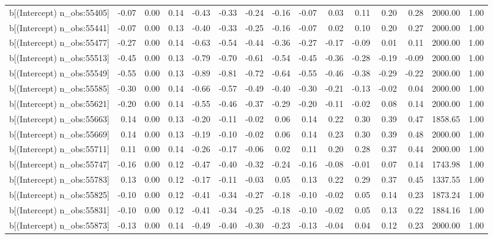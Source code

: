 \begin{table}[ht]
\begin{tabular}{rrrrrrrrrrrrrrr}
  b[(Intercept) n\_obs:55405] & -0.07 & 0.00 & 0.14 & -0.43 & -0.33 & -0.24 & -0.16 & -0.07 & 0.03 & 0.11 & 0.20 & 0.28 & 2000.00 & 1.00 \\ 
  b[(Intercept) n\_obs:55441] & -0.07 & 0.00 & 0.13 & -0.40 & -0.33 & -0.25 & -0.16 & -0.07 & 0.02 & 0.10 & 0.20 & 0.27 & 2000.00 & 1.00 \\ 
  b[(Intercept) n\_obs:55477] & -0.27 & 0.00 & 0.14 & -0.63 & -0.54 & -0.44 & -0.36 & -0.27 & -0.17 & -0.09 & 0.01 & 0.11 & 2000.00 & 1.00 \\ 
  b[(Intercept) n\_obs:55513] & -0.45 & 0.00 & 0.13 & -0.79 & -0.70 & -0.61 & -0.54 & -0.45 & -0.36 & -0.28 & -0.19 & -0.09 & 2000.00 & 1.00 \\ 
  b[(Intercept) n\_obs:55549] & -0.55 & 0.00 & 0.13 & -0.89 & -0.81 & -0.72 & -0.64 & -0.55 & -0.46 & -0.38 & -0.29 & -0.22 & 2000.00 & 1.00 \\ 
  b[(Intercept) n\_obs:55585] & -0.30 & 0.00 & 0.14 & -0.66 & -0.57 & -0.49 & -0.40 & -0.30 & -0.21 & -0.13 & -0.02 & 0.04 & 2000.00 & 1.00 \\ 
  b[(Intercept) n\_obs:55621] & -0.20 & 0.00 & 0.14 & -0.55 & -0.46 & -0.37 & -0.29 & -0.20 & -0.11 & -0.02 & 0.08 & 0.14 & 2000.00 & 1.00 \\ 
  b[(Intercept) n\_obs:55663] & 0.14 & 0.00 & 0.13 & -0.20 & -0.11 & -0.02 & 0.06 & 0.14 & 0.22 & 0.30 & 0.39 & 0.47 & 1858.65 & 1.00 \\ 
  b[(Intercept) n\_obs:55669] & 0.14 & 0.00 & 0.13 & -0.19 & -0.10 & -0.02 & 0.06 & 0.14 & 0.23 & 0.30 & 0.39 & 0.48 & 2000.00 & 1.00 \\ 
  b[(Intercept) n\_obs:55711] & 0.11 & 0.00 & 0.14 & -0.26 & -0.17 & -0.06 & 0.02 & 0.11 & 0.20 & 0.28 & 0.37 & 0.44 & 2000.00 & 1.00 \\ 
  b[(Intercept) n\_obs:55747] & -0.16 & 0.00 & 0.12 & -0.47 & -0.40 & -0.32 & -0.24 & -0.16 & -0.08 & -0.01 & 0.07 & 0.14 & 1743.98 & 1.00 \\ 
  b[(Intercept) n\_obs:55783] & 0.13 & 0.00 & 0.12 & -0.17 & -0.11 & -0.03 & 0.05 & 0.13 & 0.22 & 0.29 & 0.37 & 0.45 & 1337.55 & 1.00 \\ 
  b[(Intercept) n\_obs:55825] & -0.10 & 0.00 & 0.12 & -0.41 & -0.34 & -0.27 & -0.18 & -0.10 & -0.02 & 0.05 & 0.14 & 0.23 & 1873.24 & 1.00 \\ 
  b[(Intercept) n\_obs:55831] & -0.10 & 0.00 & 0.12 & -0.41 & -0.34 & -0.25 & -0.18 & -0.10 & -0.02 & 0.05 & 0.13 & 0.22 & 1884.16 & 1.00 \\ 
  b[(Intercept) n\_obs:55873] & -0.13 & 0.00 & 0.14 & -0.49 & -0.40 & -0.30 & -0.23 & -0.13 & -0.04 & 0.04 & 0.12 & 0.23 & 2000.00 & 1.00 \\ 

\end{tabular}
\end{table}
